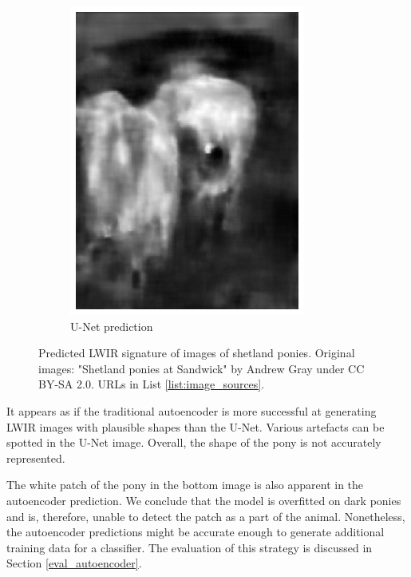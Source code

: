\documentclass{l4proj}
\begin{document}
\begin{figure}[ht]
\begin{subfigure}[h!]{0.22\textwidth}
    \includegraphics[width=\textwidth, trim={0cm, 1cm, 0cm, 1cm}, clip]{images/autoencoder/pony_2/unet.png}
    \caption{U-Net prediction}
  \end{subfigure}
  \caption{Predicted LWIR signature of images of shetland ponies. Original images: "Shetland ponies at Sandwick" by Andrew Gray under CC BY-SA 2.0. URLs in List \ref{list:image_sources}.}
  \label{fig:autoencoder_pony}
\end{figure}

It appears as if the traditional autoencoder is more successful at generating LWIR images with plausible shapes than the U-Net. Various artefacts can be spotted in the U-Net image. Overall, the shape of the pony is not accurately represented. 

The white patch of the pony in the bottom image is also apparent in the autoencoder prediction. We conclude that the model is overfitted on dark ponies and is, therefore, unable to detect the patch as a part of the animal. Nonetheless, the autoencoder predictions might be accurate enough to generate additional training data for a classifier. The evaluation of this strategy is discussed in Section \ref{eval_autoencoder}.
\end{document}
